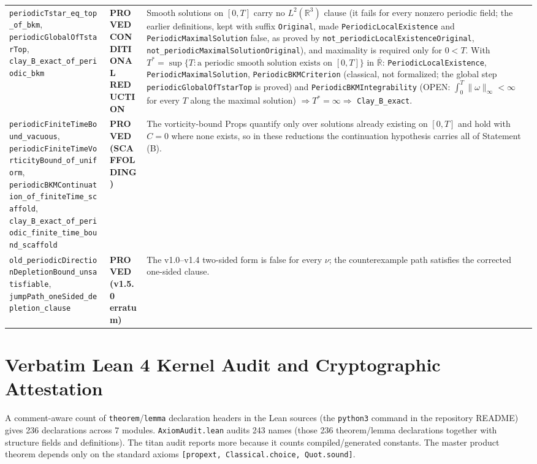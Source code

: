 \documentclass[11pt,a4paper]{article}
\theoremstyle{definition}
\begin{document}
\begin{table}[htbp]
\begin{tabular}{p{}p{}p{}}
\addlinespace
\texttt{periodicTstar\_eq\_top\_of\_bkm}, \texttt{periodicGlobalOfTstarTop}, \texttt{clay\_B\_exact\_of\_periodic\_bkm} & \textbf{PROVED CONDITIONAL REDUCTION} & Smooth solutions on $[0,T]$ carry no $L^2(\mathbb{R}^3)$ clause (it fails for every nonzero periodic field; the earlier definitions, kept with suffix \texttt{Original}, made \texttt{PeriodicLocalExistence} and \texttt{PeriodicMaximalSolution} false, as proved by \texttt{not\_periodicLocalExistenceOriginal}, \texttt{not\_periodicMaximalSolutionOriginal}), and maximality is required only for $0<T$. With $T^*=\sup\{T : \text{a periodic smooth solution exists on } [0,T]\}$ in $\overline{\mathbb{R}}$: \texttt{PeriodicLocalExistence}, \texttt{PeriodicMaximalSolution}, \texttt{PeriodicBKMCriterion} (classical, not formalized; the global step \texttt{periodicGlobalOfTstarTop} is proved) and \texttt{PeriodicBKMIntegrability} (OPEN: $\int_0^T\|\omega\|_\infty<\infty$ for every $T$ along the maximal solution) $\Rightarrow T^*=\infty \Rightarrow$ \texttt{Clay\_B\_exact}. \\
\addlinespace
\texttt{periodicFiniteTimeBound\_vacuous}, \texttt{periodicFiniteTimeVorticityBound\_of\_uniform}, \texttt{periodicBKMContinuation\_of\_finiteTime\_scaffold}, \texttt{clay\_B\_exact\_of\_periodic\_finite\_time\_bound\_scaffold} & \textbf{PROVED (SCAFFOLDING)} & The vorticity-bound Props quantify only over solutions already existing on $[0,T]$ and hold with $C=0$ where none exists, so in these reductions the continuation hypothesis carries all of Statement (B). \\
\addlinespace
\texttt{old\_periodicDirectionDepletionBound\_unsatisfiable}, \texttt{jumpPath\_oneSided\_depletion\_clause} & \textbf{PROVED (v1.5.0 erratum)} & The v1.0--v1.4 two-sided form is false for every $\nu$; the counterexample path satisfies the corrected one-sided clause. \\
\bottomrule
\end{tabular}
\end{table}

\section{Verbatim Lean 4 Kernel Audit and Cryptographic Attestation}

A comment-aware count of \texttt{theorem}/\texttt{lemma} declaration headers in the Lean sources (the \texttt{python3} command in the repository README) gives 236 declarations across 7 modules. \texttt{AxiomAudit.lean} audits 243 names (those 236 theorem/lemma declarations together with structure fields and definitions). The titan audit reports more because it counts compiled/generated constants. The master product theorem depends only on the standard axioms \texttt{[propext, Classical.choice, Quot.sound]}.
\end{document}
